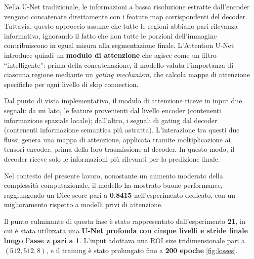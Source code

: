 Nella U-Net tradizionale, le informazioni a bassa risoluzione estratte dall’encoder vengono concatenate direttamente con i feature map corrispondenti del decoder. Tuttavia, questo approccio assume che tutte le regioni abbiano pari rilevanza informativa, ignorando il fatto che non tutte le porzioni dell’immagine contribuiscono in egual misura alla segmentazione finale. L’Attention U-Net introduce quindi un \textbf{modulo di attenzione} che agisce come un filtro “intelligente”: prima della concatenazione, il modello valuta l’importanza di ciascuna regione mediante un \textit{gating mechanism}, che calcola mappe di attenzione specifiche per ogni livello di skip connection.

Dal punto di vista implementativo, il modulo di attenzione riceve in input due segnali: da un lato, le feature provenienti dal livello encoder (contenenti informazione spaziale locale); dall’altro, i segnali di gating dal decoder (contenenti informazione semantica più astratta). L’interazione tra questi due flussi genera una mappa di attenzione, applicata tramite moltiplicazione ai tensori encoder, prima della loro trasmissione al decoder. In questo modo, il decoder riceve solo le informazioni più rilevanti per la predizione finale.

Nel contesto del presente lavoro, nonostante un aumento moderato della complessità computazionale, il modello ha mostrato buone performance, raggiungendo un Dice score pari a \textbf{0.8415} nell’esperimento dedicato, con un miglioramento rispetto a modelli privi di attenzione.


Il punto culminante di questa fase è stato rappresentato dall’esperimento \textbf{21}, in cui è stata utilizzata una \textbf{U-Net profonda con cinque livelli e stride finale lungo l’asse z pari a 1}. L’input adottava una ROI size tridimensionale pari a $(512, 512, 8)$, e il training è stato prolungato fino a \textbf{200 epoche} \ref{fig:losses}. 

